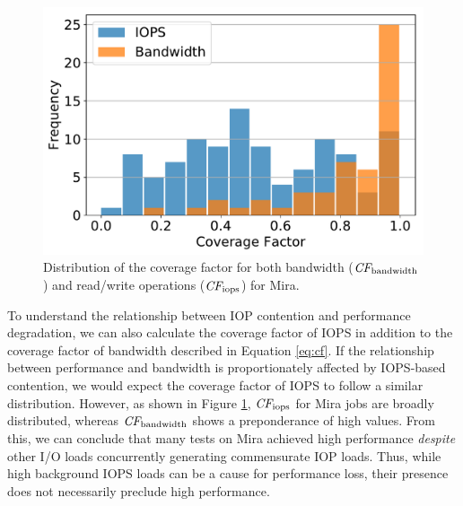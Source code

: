 \begin{figure}[t]
    \centering
    \includegraphics[width=\columnwidth]{figs/hist-cf-bw-and-ops.pdf}
    \caption{Distribution of the coverage factor for both bandwidth ($\textit{CF}_{\textup{bandwidth}}$) and read/write operations ($\textit{CF}_{\textup{iops}}$) for Mira.
    }
    \label{fig:hist-cf-mira}
\end{figure}

To understand the relationship between IOP contention and performance degradation, we can also calculate the coverage factor of IOPS in addition to the coverage factor of bandwidth described in Equation \ref{eq:cf}.
If the relationship between performance and bandwidth is proportionately affected by IOPS-based contention, we would expect the coverage factor of IOPS to follow a similar distribution.
However, as shown in Figure \ref{fig:hist-cf-mira}, $\textit{CF}_{\textup{iops}}$ for Mira jobs are broadly distributed, whereas $\textit{CF}_{\textup{bandwidth}}$ shows a preponderance of high values.
From this, we can conclude that many tests on Mira achieved high performance \emph{despite} other I/O loads concurrently generating commensurate IOP loads.
Thus, while high background IOPS loads can be a cause for performance loss, their presence does not necessarily preclude high performance.


